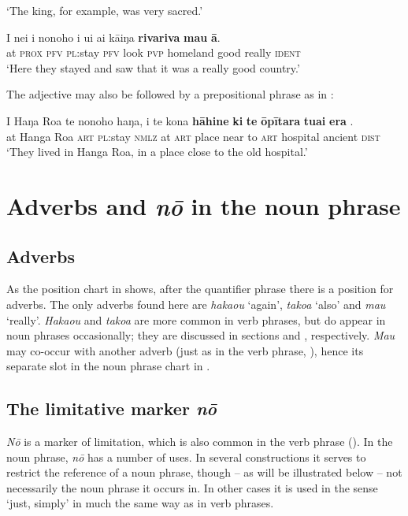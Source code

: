 \glt 
‘The king, for example, was very sacred.’ \textstyleExampleref{[R371.009]} 
\z

\ea\label{ex:5.142}
\gll {\ꞌ}I nei i nonoho i u{\ꞌ}i ai kāiŋa \textbf{rivariva} \textbf{mau} \textbf{{\ꞌ}ā}. \\
at \textsc{prox} \textsc{pfv} \textsc{pl}:stay \textsc{pfv} look \textsc{pvp} homeland good really \textsc{ident} \\

\glt
‘Here they stayed and saw that it was a really good country.’ \textstyleExampleref{[R420.054]} 
\z

The adjective may also be followed by a prepositional phrase as in :

\ea\label{ex:5.143}
\gll {\ꞌ}I Haŋa Roa te nonoho haŋa, {\ꞌ}i te kona {\ob}\textbf{hāhine}   {\ob}\textbf{ki} \textbf{te} \textbf{{\ꞌ}ōpītara} \textbf{tuai} \textbf{era}\,{\cb}\,{\cb}.\\
at Hanga Roa \textsc{art} \textsc{pl}:stay \textsc{nmlz} at \textsc{art} place {\db}near {\db}to \textsc{art} hospital ancient \textsc{dist}\\

\glt 
‘They lived in Hanga Roa, in a place close to the old hospital.’ \textstyleExampleref{[R380.003]} 
\z{}
\section{Adverbs and \textit{nō} in the noun phrase}\label{sec:5.8}
\subsection{Adverbs}\label{sec:5.8.1}
As the position chart in  shows, after the quantifier phrase there is a position for adverbs. The only adverbs found here are \textit{haka{\ꞌ}ou} ‘again’, \textit{tako{\ꞌ}a} ‘also’ and \textit{mau} ‘really’. \textit{Haka{\ꞌ}ou} and \textit{tako{\ꞌ}a} are more common in verb phrases, but do appear in noun phrases occasionally; they are discussed in sections  and , respectively. \textit{Mau} may co-occur with another adverb (just as in the verb phrase, ), hence its separate slot in the noun phrase chart in .

\subsection{The limitative marker \textit{nō}}\label{sec:5.8.2}
\textit{Nō} is a marker of limitation, which is also common in the verb phrase (). In the noun phrase, \textit{nō} has a number of uses. In several constructions it serves to restrict the reference of a noun phrase, though – as will be illustrated below – not necessarily the noun phrase it occurs in. In other cases it is used in the sense ‘just, simply’ in much the same way as in verb phrases.

